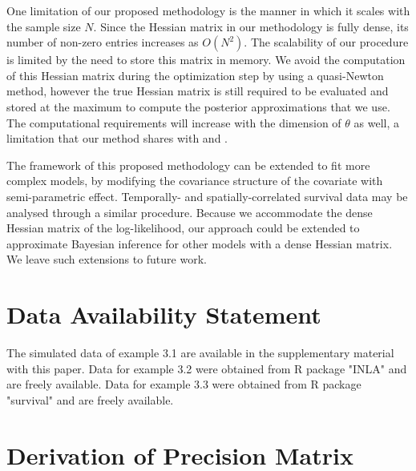 \documentclass[ba]{imsart}
\begin{document}
One limitation of our proposed methodology is the manner in which it scales with the sample size $N$. Since the Hessian matrix in our methodology is fully dense, its number of non-zero entries increases as $O(N^{2})$. The scalability of our procedure is limited by the need to store this matrix in memory. We avoid the computation of this Hessian matrix during the optimization step by using a quasi-Newton method, however the true Hessian matrix is still required to be evaluated and stored at the maximum to compute the posterior approximations that we use. The computational requirements will increase with the dimension of $\theta$ as well, a limitation that our method shares with \citet{inla} and \cite{casecross}.

The framework of this proposed methodology can be extended to fit more complex models, by modifying the covariance structure of the covariate with semi-parametric effect. Temporally- and spatially-correlated survival data may be analysed through a similar procedure. Because we accommodate the dense Hessian matrix of the log-likelihood, our approach could be extended to approximate Bayesian inference for other models with a dense Hessian matrix. We leave such extensions to future work.

\section*{Data Availability Statement}
The simulated data of example 3.1 are available in the supplementary material with this paper. Data for example 3.2 were obtained from R package "INLA" \citep{inla} and are freely available.
Data for example 3.3 were obtained from R package "survival" \citep{survival-package} and are freely available. 

\appendix

\section{Derivation of Precision Matrix}
\end{document}
